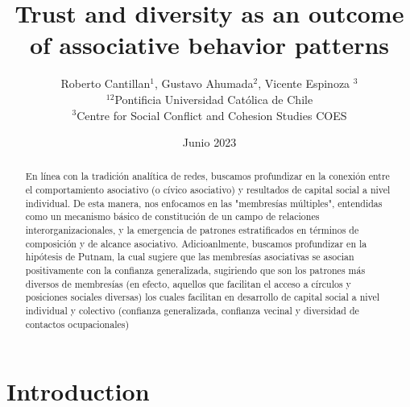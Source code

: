 





\title{Trust and diversity as an outcome of associative behavior patterns}
\author{Roberto Cantillan$^{1}$, Gustavo Ahumada$^{2}$, Vicente Espinoza $^{3}$  \\
        \small $^{12}$Pontificia Universidad Católica de Chile \\
        \small $^{3}$Centre for Social Conflict and Cohesion Studies COES \\
}

\date{Junio 2023}



\maketitle


\begin{abstract}
En línea con la tradición analítica de redes, buscamos profundizar en la conexión entre el comportamiento asociativo (o cívico asociativo) y resultados de capital social a nivel individual. De esta manera, nos enfocamos en las "membresías múltiples", entendidas como un mecanismo básico de constitución de un campo de relaciones interorganizacionales, y la emergencia de patrones estratificados en términos de composición y de alcance asociativo. Adicioanlmente, buscamos profundizar en la hipótesis de Putnam, la cual sugiere que las membresías asociativas se asocian positivamente con la confianza generalizada, sugiriendo que son los patrones más diversos de membresías (en efecto, aquellos que facilitan el acceso a círculos y posiciones sociales diversas) los cuales facilitan en desarrollo de capital social a nivel individual y colectivo (confianza generalizada, confianza vecinal y diversidad de contactos ocupacionales)
\end{abstract}
\hspace{10pt}


\newpage


\maketitle

\section{Introduction}

